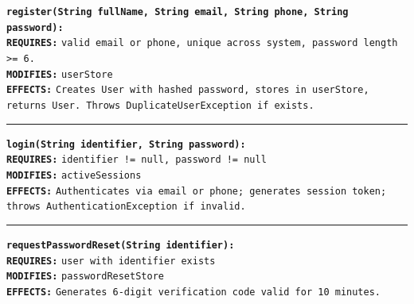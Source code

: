 \documentclass[11pt,a4paper]{article}
\begin{document}
\begin{contractbox}
\begin{latin}
\setlength{\parindent}{0pt}
\setlength{\parskip}{2pt}
\small
\textbf{\color{autnavy}\texttt{register(String fullName, String email, String phone, String password):}} \\
\hspace*{1.5em}\textbf{\color{darkred}\texttt{REQUIRES:}} \texttt{valid email or phone, unique across system, password length >= 6.} \\
\hspace*{1.5em}\textbf{\color{autblue}\texttt{MODIFIES:}} \texttt{userStore} \\
\hspace*{1.5em}\textbf{\color{autteal}\texttt{EFFECTS:}}  \texttt{Creates User with hashed password, stores in userStore, returns User. Throws DuplicateUserException if exists.}

\vspace{4pt}\hrule\vspace{4pt}

\textbf{\color{autnavy}\texttt{login(String identifier, String password):}} \\
\hspace*{1.5em}\textbf{\color{darkred}\texttt{REQUIRES:}} \texttt{identifier != null, password != null} \\
\hspace*{1.5em}\textbf{\color{autblue}\texttt{MODIFIES:}} \texttt{activeSessions} \\
\hspace*{1.5em}\textbf{\color{autteal}\texttt{EFFECTS:}}  \texttt{Authenticates via email or phone; generates session token; throws AuthenticationException if invalid.}

\vspace{4pt}\hrule\vspace{4pt}

\textbf{\color{autnavy}\texttt{requestPasswordReset(String identifier):}} \\
\hspace*{1.5em}\textbf{\color{darkred}\texttt{REQUIRES:}} \texttt{user with identifier exists} \\
\hspace*{1.5em}\textbf{\color{autblue}\texttt{MODIFIES:}} \texttt{passwordResetStore} \\
\hspace*{1.5em}\textbf{\color{autteal}\texttt{EFFECTS:}}  \texttt{Generates 6-digit verification code valid for 10 minutes.}


\end{latin}
\end{contractbox}
\end{document}
